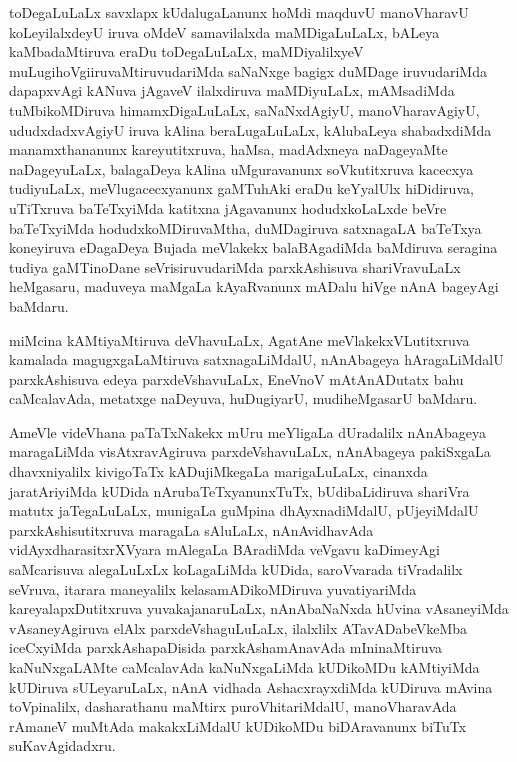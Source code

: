 \documentclass{article}
\begin{document}
\begin{mn}
toDegaLuLaLx  savxlapx  kUdalugaLanunx  hoMdi  maqduvU  manoVharavU  koLeyilalxdeyU  iruva  oMdeV  samavilalxda  maMDigaLuLaLx,  
bALeya  kaMbadaMtiruva  eraDu  toDegaLuLaLx,  maMDiyalilxyeV  muLugihoVgiiruvaMtiruvudariMda  saNaNxge  bagigx  duMDage  
iruvudariMda  dapapxvAgi  kANuva  jAgaveV  ilalxdiruva  maMDiyuLaLx,  mAMsadiMda  tuMbikoMDiruva  himamxDigaLuLaLx,  
saNaNxdAgiyU,  manoVharavAgiyU,  ududxdadxvAgiyU  iruva  kAlina  beraLugaLuLaLx,  kAlubaLeya  shabadxdiMda  manamxthananunx  
kareyutitxruva,  haMsa,  madAdxneya  naDageyaMte  naDageyuLaLx,  balagaDeya  kAlina  uMguravanunx  soVkutitxruva  kacecxya  
tudiyuLaLx,  meVlugacecxyanunx  gaMTuhAki  eraDu  keYyalUlx  hiDidiruva,  uTiTxruva  baTeTxyiMda  katitxna  jAgavanunx  
hodudxkoLaLxde  beVre  baTeTxyiMda  hodudxkoMDiruvaMtha,  duMDagiruva  satxnagaLA  baTeTxya  koneyiruva  eDagaDeya  Bujada  
meVlakekx  balaBAgadiMda  baMdiruva  seragina  tudiya  gaMTinoDane  seVrisiruvudariMda  parxkAshisuva  shariVravuLaLx  
heMgasaru,  maduveya  maMgaLa  kAyaRvanunx  mADalu  hiVge  nAnA  bageyAgi  baMdaru.
\end{mn}

\begin{mn}
miMcina  kAMtiyaMtiruva  deVhavuLaLx,  AgatAne  meVlakekxVLutitxruva  kamalada  magugxgaLaMtiruva  satxnagaLiMdalU,  
nAnAbageya  hAragaLiMdalU  parxkAshisuva  edeya  parxdeVshavuLaLx,  EneVnoV  mAtAnADutatx  bahu  caMcalavAda,  
metatxge  naDeyuva,  huDugiyarU,  mudiheMgasarU  baMdaru.
\end{mn}

\begin{mn}
AmeVle  videVhana  paTaTxNakekx  mUru  meYligaLa  dUradalilx  nAnAbageya  maragaLiMda  visAtxravAgiruva  parxdeVshavuLaLx,  
nAnAbageya  pakiSxgaLa  dhavxniyalilx  kivigoTaTx  kADujiMkegaLa  marigaLuLaLx,  cinanxda  jaratAriyiMda  kUDida  
nArubaTeTxyanunxTuTx,  bUdibaLidiruva  shariVra  matutx  jaTegaLuLaLx,  munigaLa  guMpina  dhAyxnadiMdalU,  pUjeyiMdalU  
parxkAshisutitxruva  maragaLa  sAluLaLx,  nAnAvidhavAda  vidAyxdharasitxrXVyara  mAlegaLa  BAradiMda  veVgavu  kaDimeyAgi  
saMcarisuva  alegaLuLxLx  koLagaLiMda  kUDida,  saroVvarada  tiVradalilx  seVruva,  itarara  maneyalilx  kelasamADikoMDiruva  
yuvatiyariMda  kareyalapxDutitxruva  yuvakajanaruLaLx,  nAnAbaNaNxda  hUvina  vAsaneyiMda  vAsaneyAgiruva  elAlx  parxdeVshaguLuLaLx,  
ilalxlilx  ATavADabeVkeMba  iceCxyiMda  parxkAshapaDisida  parxkAshamAnavAda  mIninaMtiruva  kaNuNxgaLAMte  caMcalavAda  kaNuNxgaLiMda  
kUDikoMDu  kAMtiyiMda  kUDiruva  sULeyaruLaLx,  nAnA  vidhada  AshacxrayxdiMda  kUDiruva  mAvina  toVpinalilx,  dasharathanu  maMtirx  
puroVhitariMdalU,  manoVharavAda  rAmaneV  muMtAda  makakxLiMdalU  kUDikoMDu  biDAravanunx  biTuTx  suKavAgidadxru.
\end{mn}
\end{document}
